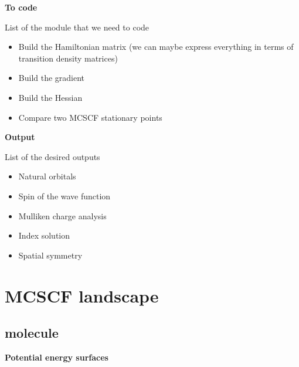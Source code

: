 \documentclass[11pt,a4paper]{article}
\begin{document}
\noindent\textbf{To code}

List of the module that we need to code
\begin{itemize}
\item Build the Hamiltonian matrix (we can maybe express everything in terms of transition density matrices)
\item Build the gradient
\item Build the Hessian
\item Compare two MCSCF stationary points
\end{itemize}

\noindent\textbf{Output}

List of the desired outputs
\begin{itemize}
\item Natural orbitals
\item Spin of the wave function
\item Mulliken charge analysis
\item Index solution
\item Spatial symmetry
\end{itemize}

\section{MCSCF landscape}
\label{sec:MCSCFland}

\subsection{ molecule}

\textbf{Potential energy surfaces}
\end{document}
